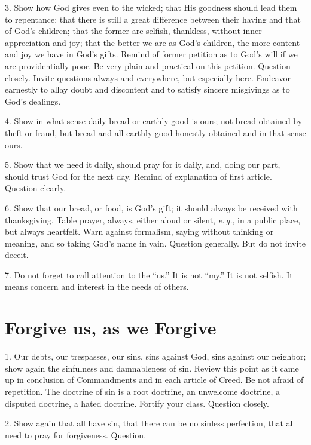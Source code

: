 3. Show how God gives even to the wicked; that His goodness should lead them to repentance; that there is still a great difference between their having and that of God’s children; that the former are
selfish, thankless, without inner appreciation and joy; that the better we are as God’s children, the more content and joy we have in God’s gifts. Remind of former petition as to God’s will if we are providentially poor. Be very plain and practical on this petition. Question closely. Invite questions always and everywhere, but especially here. Endeavor earnestly to allay doubt and discontent and to satisfy sincere misgivings as to God’s dealings.

4. Show in what sense daily bread or earthly good is ours; not bread obtained by theft or fraud, but bread and all earthly good honestly obtained and in that sense ours. 

5. Show that we need it daily, should pray for it daily, and, doing our part, should trust God for the next day. Remind of explanation of first article. Question clearly.

6. Show that our bread, or food, is God’s gift; it should always be received with thanksgiving. Table prayer, always, either aloud or silent, \emph{e.\,g.}, in a public place, but always heartfelt. Warn against formalism, saying without thinking or meaning, and so taking God’s name in vain.  Question generally. But do not invite deceit.

7. Do not forget to call attention to the “us.” It is not “my.” It is not selfish. It means concern and interest in the needs of others.

\section{Forgive us, as we Forgive}

1. Our debts, our trespasses, our sins, sins against God, sins against our neighbor; show again the sinfulness and damnableness of sin. Review this point as it came up in conclusion of Commandments and in each article of Creed. Be not afraid of repetition. The doctrine of sin is a root doctrine,  an unwelcome doctrine, a disputed doctrine, a hated doctrine. Fortify your class. Question closely.

2. Show again that all have sin, that there can be no sinless perfection, that all need to pray for forgiveness.  Question.

